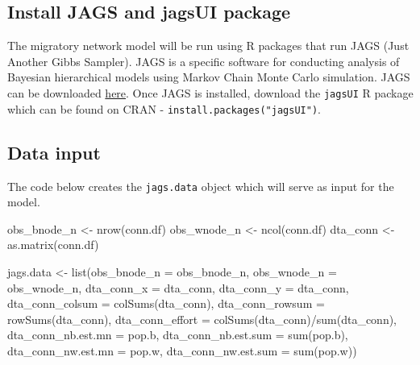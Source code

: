\documentclass[
]{book}
\newenvironment{Shaded}{\begin{snugshade}}{\end{snugshade}}
\newcommand{\AttributeTok}[1]{\textcolor[rgb]{0.77,0.63,0.00}{#1}}
\newcommand{\FunctionTok}[1]{\textcolor[rgb]{0.00,0.00,0.00}{#1}}
\newcommand{\NormalTok}[1]{#1}
\newcommand{\OtherTok}[1]{\textcolor[rgb]{0.56,0.35,0.01}{#1}}
\newcommand{\SpecialCharTok}[1]{\textcolor[rgb]{0.00,0.00,0.00}{#1}}
\begin{document}
\hypertarget{install-jags-and-jagsui-package}{%
\subsection{Install JAGS and jagsUI package}\label{install-jags-and-jagsui-package}}

The migratory network model will be run using R packages that run JAGS (Just Another Gibbs Sampler). JAGS is a specific software for conducting analysis of Bayesian hierarchical models using Markov Chain Monte Carlo simulation. JAGS can be downloaded \href{https://mcmc-jags.sourceforge.io/}{here}. Once JAGS is installed, download the \texttt{jagsUI} R package which can be found on CRAN - \texttt{install.packages("jagsUI")}.

\hypertarget{data-input}{%
\subsection{Data input}\label{data-input}}

The code below creates the \texttt{jags.data} object which will serve as input for the model.

\begin{Shaded}
\begin{Highlighting}[]
\NormalTok{obs\_bnode\_n }\OtherTok{\textless{}{-}} \FunctionTok{nrow}\NormalTok{(conn.df)}
\NormalTok{obs\_wnode\_n }\OtherTok{\textless{}{-}} \FunctionTok{ncol}\NormalTok{(conn.df)}
\NormalTok{dta\_conn }\OtherTok{\textless{}{-}} \FunctionTok{as.matrix}\NormalTok{(conn.df)}

\NormalTok{jags.data }\OtherTok{\textless{}{-}} \FunctionTok{list}\NormalTok{(}\AttributeTok{obs\_bnode\_n =}\NormalTok{ obs\_bnode\_n,}
                  \AttributeTok{obs\_wnode\_n =}\NormalTok{ obs\_wnode\_n,}
                  \AttributeTok{dta\_conn\_x =}\NormalTok{ dta\_conn,}
                  \AttributeTok{dta\_conn\_y =}\NormalTok{ dta\_conn,}
                  \AttributeTok{dta\_conn\_colsum =} \FunctionTok{colSums}\NormalTok{(dta\_conn),}
                  \AttributeTok{dta\_conn\_rowsum =} \FunctionTok{rowSums}\NormalTok{(dta\_conn),}
                  \AttributeTok{dta\_conn\_effort =} \FunctionTok{colSums}\NormalTok{(dta\_conn)}\SpecialCharTok{/}\FunctionTok{sum}\NormalTok{(dta\_conn),}
                  \AttributeTok{dta\_conn\_nb.est.mn =}\NormalTok{ pop.b,}
                  \AttributeTok{dta\_conn\_nb.est.sum =} \FunctionTok{sum}\NormalTok{(pop.b),}
                  \AttributeTok{dta\_conn\_nw.est.mn =}\NormalTok{ pop.w,}
                  \AttributeTok{dta\_conn\_nw.est.sum =} \FunctionTok{sum}\NormalTok{(pop.w))}
\end{Highlighting}
\end{Shaded}
\end{document}
